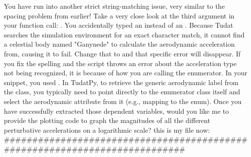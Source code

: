 {}
\markdownRendererSectionEnd \markdownRendererSectionBegin
{}\markdownRendererInterblockSeparator
{}\markdownRendererSectionBegin
{}\markdownRendererInterblockSeparator
{}You have run into another strict string-matching issue, very similar to the spacing problem from earlier!\markdownRendererInterblockSeparator
{}Take a very close look at the third argument in your function call: . You accidentally typed an  instead of an .\markdownRendererInterblockSeparator
{}Because Tudat searches the simulation environment for an exact character match, it cannot find a celestial body named "Ganynede" to calculate the aerodynamic acceleration from, causing it to fail. Change that to  and that specific error will disappear.\markdownRendererInterblockSeparator
{}
\markdownRendererSectionEnd \markdownRendererSectionBegin
{}\markdownRendererInterblockSeparator
{}If you fix the spelling and the script  throws an error about the acceleration type not being recognized, it is because of how you are calling the  enumerator.\markdownRendererInterblockSeparator
{}In your snippet, you used . In TudatPy, to retrieve the generic aerodynamic label from the  class, you typically need to point directly to the enumerator class itself and select the aerodynamic attribute from it (e.g., mapping to the  enum).\markdownRendererInterblockSeparator
{}\markdownRendererThematicBreak{}\markdownRendererInterblockSeparator
{}Once you have successfully extracted those dependent variables, would you like me to provide the plotting code to graph the magnitudes of all the different perturbative accelerations on a logarithmic scale?\markdownRendererInterblockSeparator
{}\markdownRendererThematicBreak{}\markdownRendererInterblockSeparator
{}
\markdownRendererSectionEnd 
\markdownRendererSectionEnd \markdownRendererSectionBegin
{}\markdownRendererInterblockSeparator
{}this is my file now:\markdownRendererInterblockSeparator
{}###########################################################################\markdownRendererInterblockSeparator

